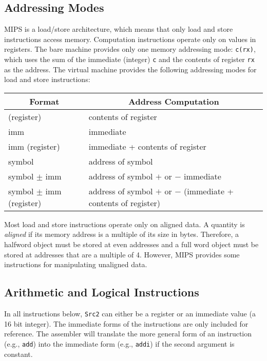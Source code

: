 \subsection {Addressing Modes}

MIPS is a load/store architecture, which means that only load and
store instructions access memory.  Computation instructions operate
only on values in registers.  The bare machine provides only one
memory addressing mode: {\tt c(rx)}, which uses the sum of the
immediate (integer) {\tt c} and the contents of register {\tt rx} as
the address.  The virtual machine provides the following addressing
modes for load and store instructions:
\begin{center}
  \small
  \begin{tabular}{|l|l|}
    \hline
    \multicolumn{1}{|c|}{\bf Format} &
	\multicolumn{1}{|c|}{\bf Address Computation} \\
    \hline
    \hline
    (register) &  contents of register \\
    imm & immediate \\
    imm (register) & immediate + contents of register \\
    symbol & address of symbol \\
    symbol $\pm$ imm & address of symbol $+$ or $-$ immediate \\
    symbol $\pm$ imm (register) & address of symbol $+$ or $-$
	(immediate + contents of register) \\
    \hline
  \end{tabular}
\end{center}

Most load and store instructions operate only on aligned data.  A
quantity is {\em aligned\/} if its memory address is a multiple of its
size in bytes.  Therefore, a halfword object must be stored at even
addresses and a full word object must be stored at addresses that are
a multiple of 4.  However, MIPS provides some instructions for
manipulating unaligned data.

\subsection {Arithmetic and Logical Instructions}

In all instructions below, {\tt Src2} can either be a register or an
immediate value (a 16 bit integer). The immediate forms of the
instructions are only included for reference.  The assembler will
translate the more general form of an instruction (e.g., {\tt add})
into the immediate form (e.g., {\tt addi}) if the second argument is
constant.

